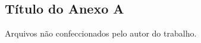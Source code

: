 \begin{anexosenv}
\chapter{Título do Anexo A}
\label{anexoA}

Arquivos não confeccionados pelo autor do trabalho.


\end{anexosenv}